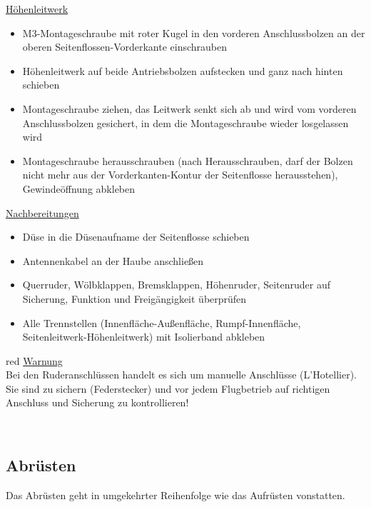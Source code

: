 \underline{Höhenleitwerk}
\begin{itemize}
\item M3-Montageschraube mit roter Kugel in den vorderen Anschlussbolzen an der oberen Seitenflossen-Vorderkante einschrauben
\item Höhenleitwerk auf beide Antriebsbolzen aufstecken und ganz nach hinten schieben
\item Montageschraube ziehen, das Leitwerk senkt sich ab und wird vom vorderen Anschlussbolzen gesichert, in dem die Montageschraube wieder losgelassen wird
\item Montageschraube herausschrauben (nach Herausschrauben, darf der Bolzen nicht mehr aus der Vorderkanten-Kontur der Seitenflosse herausstehen), Gewindeöffnung abkleben
\end{itemize}

\underline{Nachbereitungen}
\begin{itemize}
\item Düse in die Düsenaufname der Seitenflosse schieben
\item Antennenkabel an der Haube anschließen
\item Querruder, Wölbklappen, Bremsklappen, Höhenruder, Seitenruder auf Sicherung, Funktion und Freigängigkeit überprüfen
\item Alle Trennstellen (Innenfläche-Außenfläche, Rumpf-Innenfläche, Seitenleitwerk-Höhenleitwerk) mit Isolierband abkleben
\end{itemize}
\begin{color}{red}
\large{\underline{Warnung}}\\
Bei den Ruderanschlüssen handelt es sich um manuelle Anschlüsse (L'Hotellier). Sie sind zu sichern (Federstecker) und vor jedem Flugbetrieb auf richtigen Anschluss und Sicherung zu kontrollieren!
\end{color}\\

\subsection{Abrüsten}
Das Abrüsten geht in umgekehrter Reihenfolge wie das Aufrüsten vonstatten.

